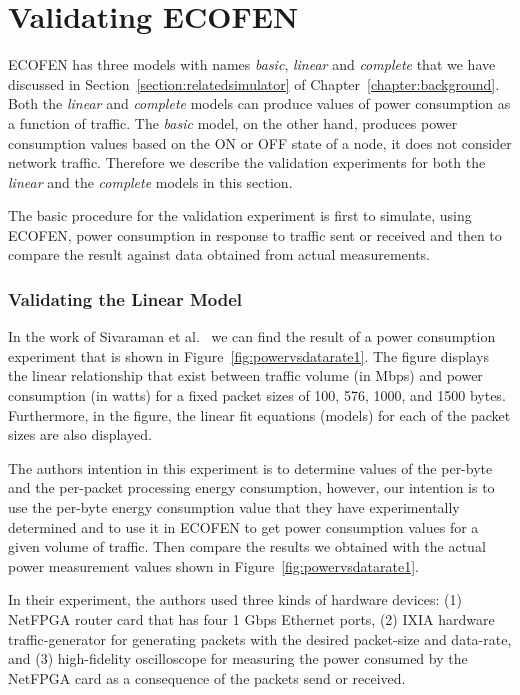 \section{Validating ECOFEN}
ECOFEN has three models with names \emph{basic}, \emph{linear} and \emph{complete} that we have discussed in Section~\ref{section:relatedsimulator} of Chapter~\ref{chapter:background}. Both the \emph{linear} and \emph{complete} models can produce values of power consumption as a function of traffic. The  \emph{basic} model, on the other hand, produces power consumption values based on the ON or OFF state of a node, it does not consider network traffic. Therefore we describe the validation experiments for both the \emph{linear} and the \emph{complete} models in this section. 
 
The basic procedure for the validation experiment is first to simulate, using ECOFEN, power consumption in response to traffic sent or received and then to compare the result against data obtained from actual measurements.
\subsubsection{Validating the Linear Model}
In the work of Sivaraman et al.{\ }\cite{Sivaraman} we can find the result of a power consumption experiment that is shown in Figure~\ref{fig:powervsdatarate1}. The figure displays the linear relationship that exist between traffic volume (in Mbps) and power consumption (in watts) for a fixed packet sizes of 100, 576, 1000, and 1500 bytes. Furthermore, in the figure, the linear fit equations (models) for each of the packet sizes are also displayed. 

The authors intention in this experiment is to determine values of the per-byte and the per-packet processing energy consumption, however, our intention is to use the per-byte energy consumption value that they have experimentally determined and to use it in ECOFEN to get power consumption values for a given volume of traffic. Then compare the results we obtained with the actual power measurement values shown in Figure~\ref{fig:powervsdatarate1}.

In their experiment, the authors used three kinds of hardware devices: (1) NetFPGA router card that has four 1 Gbps Ethernet ports, (2) IXIA hardware traffic-generator for generating packets with the desired packet-size and data-rate, and (3) high-fidelity oscilloscope for measuring the power consumed by the NetFPGA card as a consequence of the packets send or received. 

